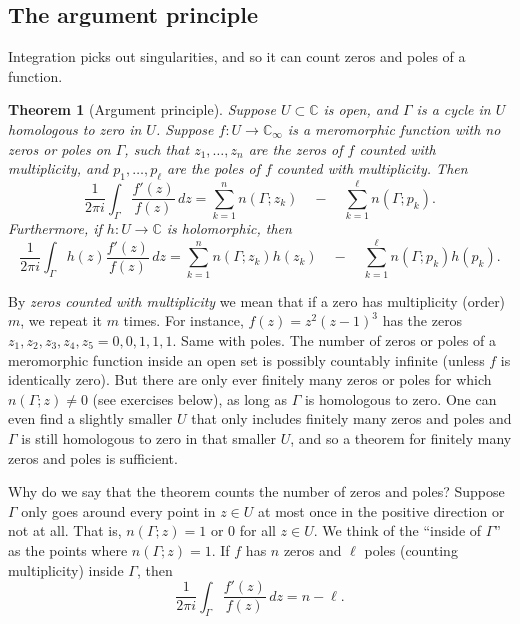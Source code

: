 \documentclass[12pt,openany]{book}
\newcommand{\C}{{\mathbb{C}}}
\newcommand{\myindex}[1]{#1\index{#1}}
\newcommand{\myquote}[1]{``#1''}
\theoremstyle{plain}
\newtheorem{thm}{Theorem}[section]
\theoremstyle{remark}
\theoremstyle{definition}
\theoremstyle{exercise}
\theoremstyle{example}
\begin{document}
\subsection{The argument principle}

Integration picks out singularities, and so it can count zeros and
poles of a function.

\begin{thm}[Argument principle]\label{thm:argprinc}
\pagebreak[2]
Suppose $U \subset \C$ is open, and $\Gamma$ is a cycle in $U$
homologous to zero in $U$.
Suppose $f \colon U \to \C_\infty$ is a meromorphic function with no zeros
or poles on $\Gamma$,
such that
$z_1,\ldots,z_n$ are the 
zeros of $f$ counted with multiplicity,
and $p_1,\ldots,p_\ell$ are the poles of $f$ counted with multiplicity.
Then
\begin{equation*}
\frac{1}{2\pi i}
\int_\Gamma \frac{f'(z)}{f(z)} \, dz
=
\sum_{k=1}^n n(\Gamma;z_k)
\quad
-
\quad
\sum_{k=1}^\ell n(\Gamma;p_k) .
\end{equation*}
Furthermore, if $h \colon U \to \C$ is holomorphic, then
\begin{equation*}
\frac{1}{2\pi i}
\int_\Gamma h(z) \frac{f'(z)}{f(z)} \, dz
=
\sum_{k=1}^n n(\Gamma;z_k)h(z_k) 
\quad
-
\quad
\sum_{k=1}^\ell n(\Gamma;p_k)h(p_k) .
\end{equation*}
\end{thm}

By
\emph{\myindex{zeros counted with multiplicity}}
we mean that if
a zero has multiplicity (order) $m$, we repeat it $m$ times.
For instance, $f(z) = z^2{(z-1)}^3$ has the zeros $z_1,z_2,z_3,z_4,z_5 = 0,0,1,1,1$.
Same with poles.
The number of zeros or poles of a meromorphic function
inside an open set is possibly countably
infinite (unless $f$ is identically zero).
But there are only ever finitely
many zeros or poles for which 
$n(\Gamma;z) \not= 0$ (see exercises below), as long as $\Gamma$ is
homologous to zero.  One can even find a slightly smaller $U$ that only
includes finitely many zeros and poles and $\Gamma$ is still homologous to
zero in that smaller $U$, and so a theorem for finitely many zeros and poles is
sufficient.

Why do we say that the theorem counts the number of zeros and poles?
Suppose $\Gamma$ only goes around every point in $z \in U$ at most once
in the positive direction or not at all.  That is,
$n(\Gamma;z) = 1$ or $0$ for all $z \in U$.  We think of the
\myquote{inside of $\Gamma$} as the points where $n(\Gamma;z)=1$.
If $f$ has $n$ zeros and $\ell$ poles (counting multiplicity)
inside $\Gamma$, then
\begin{equation*}
\frac{1}{2\pi i}
\int_\Gamma \frac{f'(z)}{f(z)} \, dz
= n - \ell .
\end{equation*}
\end{document}
